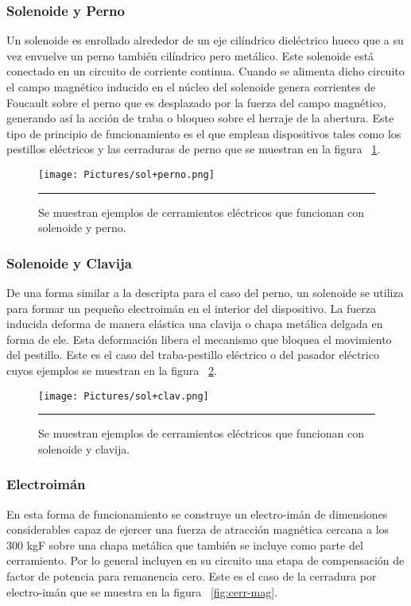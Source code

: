 \subsubsection{Solenoide y Perno}
Un solenoide es enrollado alrededor de un eje cilíndrico dieléctrico hueco que a su vez envuelve un perno también cilíndrico pero metálico. Este solenoide está conectado en un circuito de corriente continua. Cuando se alimenta dicho circuito el campo magnético inducido en el núcleo del solenoide genera corrientes de Foucault sobre el perno que es desplazado por la fuerza del campo magnético, generando así la acción de traba o bloqueo sobre el herraje de la abertura. 
Este tipo de principio de funcionamiento es el que emplean dispositivos tales como los pestillos eléctricos y las cerraduras de perno que se muestran en la figura ~\ref{fig:sol+perno}.

\begin{figure}[htbp]
	\centering
	\texttt{[image: Pictures/sol+perno.png]}
	\rule{35em}{1pt}
	\caption[Cerramientos de perno]{Se muestran ejemplos de cerramientos eléctricos que funcionan con solenoide y perno. }
	\label{fig:sol+perno}
\end{figure}

\subsubsection{Solenoide y Clavija}
De una forma similar a la descripta para el caso del perno, un solenoide se utiliza para formar un pequeño electroimán en el interior del dispositivo. La fuerza inducida deforma de manera elástica una clavija o chapa metálica delgada en forma de ele. Esta deformación libera el mecanismo que bloquea el movimiento del pestillo. Este es el caso del traba-pestillo eléctrico o del pasador eléctrico cuyos ejemplos se muestran en la figura ~\ref{fig:sol+clav}.

\begin{figure}[htbp]
	\centering
	\texttt{[image: Pictures/sol+clav.png]}
	\rule{35em}{1pt}
	\caption[Cerramientos de perno]{Se muestran ejemplos de cerramientos eléctricos que funcionan con solenoide y clavija. }
	\label{fig:sol+clav}
\end{figure}

\subsubsection{Electroimán}
En esta forma de funcionamiento se construye un electro-imán de dimensiones considerables capaz de ejercer una fuerza de atracción magnética cercana a los 300 kgF sobre una chapa metálica que también se incluye como parte del cerramiento. Por lo general incluyen en su circuito una etapa de compensación de factor de potencia para remanencia cero.
Este es el caso de la cerradura por electro-imán que se muestra en la figura ~\ref{fig:cerr-mag}.

